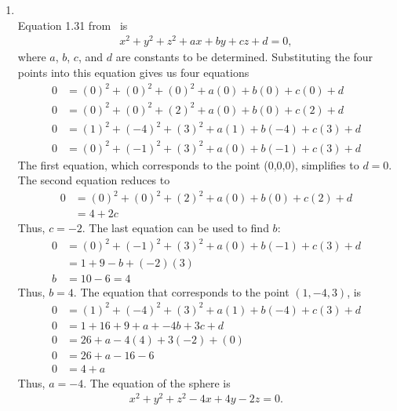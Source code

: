 \documentclass{article}
\begin{document}
\begin{enumerate}
\item 
{}\\
Equation 1.31 from \VCT \ is 
\begin{align*}
   x^2 + y^2 + z^2 + ax + by + cz + d = 0,
\end{align*}
where $a$, $b$, $c$, and $d$ are constants to be determined. Substituting the four points into this equation gives us four equations
\begin{align*}
   0 &= (0)^2 + (0)^2 + (0)^2 + a(0) + b(0) + c(0) + d \\
   0 &= (0)^2 + (0)^2 + (2)^2 + a(0) + b(0) + c(2) + d \\
   0 &= (1)^2 + (-4)^2 + (3)^2 + a(1) + b(-4) + c(3) + d \\
   0 &= (0)^2 + (-1)^2 + (3)^2 + a(0) + b(-1) + c(3) + d 
\end{align*} 
The first equation, which corresponds to the point (0,0,0), simplifies to $d=0$. The second equation reduces to
\begin{align*}
   0 &= (0)^2 + (0)^2 + (2)^2 + a(0) + b(0) + c(2) + d \\
    &= 4 + 2c
\end{align*}
Thus, $c=-2$.  The last equation can be used to find $b$:
\begin{align*}
   0 &= (0)^2 + (-1)^2 + (3)^2 + a(0) + b(-1) + c(3) + d \\
      &= 1 + 9 -b + (-2)(3) \\
      b&= 10 - 6 = 4
\end{align*} 
Thus, $b=4$. The equation that corresponds to the point $(1,-4,3)$, is
\begin{align*}
   0 &= (1)^2 + (-4)^2 + (3)^2 + a(1) + b(-4) + c(3) + d \\
   0 &= 1 + 16 + 9 + a + -4b + 3c + d \\
   0 &= 26 + a  -4(4) + 3(-2) + (0) \\
   0 &= 26 + a  -16 - 6  \\
   0 &= 4+ a 
\end{align*} 
Thus, $a= -4$. The equation of the sphere is
\begin{align*}
   x^2 + y^2 + z^2 - 4x + 4y - 2z = 0.
\end{align*}


\end{enumerate}
\end{document}

